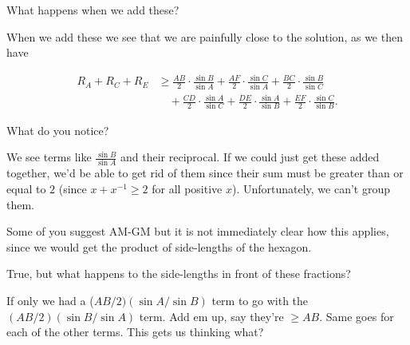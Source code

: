 What happens when we add these?

When we add these we see that we are painfully close to the solution, as we then have

\begin{align*}  
    R_A + R_C + R_E &\ge \frac{AB}{2}\cdot\frac{\sin B}{\sin A} + \frac{AF}{2}\cdot \frac{\sin C}{\sin A} + \frac{BC}{2}\cdot \frac{\sin B}{\sin C} \\  
    &\quad+ \frac{CD}{2}\cdot\frac{\sin A}{\sin C} + \frac{DE}{2}\cdot \frac{\sin A}{\sin B} + \frac{EF}{2}\cdot\frac{\sin C}{\sin B}.\end{align*}

What do you notice?




We see terms like $\frac{\sin B}{\sin A}$ and their reciprocal. If we could just get these added together, we'd be able to get rid of them since their sum must be greater than or equal to $2$ (since $x + x^{-1} \geq 2$ for all positive $x$).  Unfortunately, we can't group them.

Some of you suggest AM-GM but it is not immediately clear how this applies, since we would get the product of side-lengths of the hexagon.


True, but what happens to the side-lengths in front of these fractions?

If only we had a ($AB/2)(\sin A/\sin B)$ term to go with the $(AB/2)(\sin B/\sin A)$ term.  Add em up, say they're $\ge AB$.  Same goes for each of the other terms.  This gets us thinking what?

